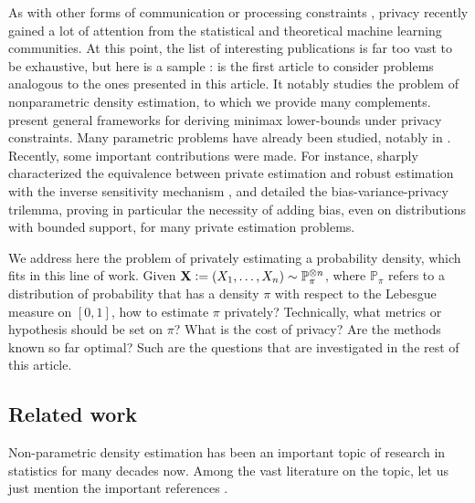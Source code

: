 \documentclass[10pt]{article} %
\newcommand{\Prob}[0]{\mathbb{P}}
\newcommand{\eqdef}{\vcentcolon=}
\newcommand\vect[1]{\mathbf{#1}}
\newcommand\p[1]{\left( {#1}\right)}
\begin{document}
As with other forms of communication or processing constraints \citep{BarnesHO19,BarnesHO20,AcharyaCST21a,AcharyaCMT21,AcharyaCST21b,AcharyaCFST21}, privacy recently gained a lot of attention from the statistical and theoretical machine learning communities. At this point, the list of interesting publications is far too vast to be exhaustive, but here is a sample : \citet{wasserman2010statistical} is the first article to consider problems analogous to the ones presented in this article. It notably studies the problem of nonparametric density estimation, to which we provide many complements. \citet{duchi2013localpreprint,duchi2013local,duchi2018minimax,barber2014privacy,acharya2021differentially,lalanne2022statistical} present general frameworks for deriving minimax lower-bounds under privacy constraints. Many parametric problems have already been studied, notably in \citet{acharya2018differentially,acharya2021differentially,karwa2017finite,kamath2019highdimensional,biswas2020coinpress,lalanne2022private,lalanne2023private,kamath2022improved,singhal2023polynomial}. Recently, some important contributions were made. For instance, \citet{asi2023robustness} sharply characterized the equivalence between private estimation and robust estimation with the inverse sensitivity mechanism \citep{asi2020near,asi2021nips}, and \citet{kamath2023biasvarianceprivacy} detailed the bias-variance-privacy trilemma, proving in particular the necessity of adding bias, even on distributions with bounded support, for many private estimation problems.

We address here the problem of privately estimating a probability density, which fits in this line of work. Given $\vect{X} \eqdef \p{X_1, \dots, X_n} \sim \Prob_\pi^{\otimes n}$, where $\Prob_\pi$ refers to a distribution of probability that 
has a density $\pi$ 
with respect to the Lebesgue measure on $[0, 1]$, how to estimate $\pi$ privately? Technically, what metrics or hypothesis should be set on $\pi$? What is the cost of privacy? Are the methods known so far optimal? Such are the questions that are investigated in the rest of this article.

\subsection{Related work}

Non-parametric density estimation has been an important topic of research in statistics for many decades now. Among the vast literature on the topic, let us just mention the important references \citet{gyorfi2002distribution,tsybakov2003introduction}. 
\end{document}
